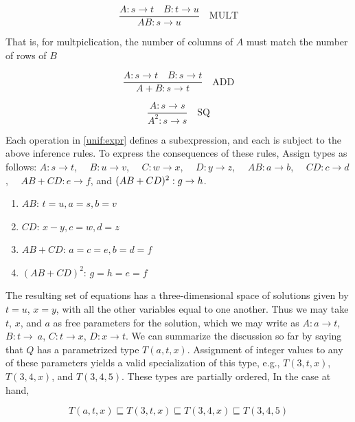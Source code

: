 \begin{equation}
\frac{A : s \to t \quad B : t \to u}{AB : s \to u}\quad \text{MULT}
\end{equation}

That is, for multpiclication, the number of columns of $A$ must match the number of rows of $B$

\begin{equation}
\frac{A : s \to t \quad B : s\to t}{A + B : s \to t}\quad \text{ADD}
\end{equation}


\begin{equation}
\frac{A : s \to s}{A^2 : s \to s}\quad \text{SQ}
\end{equation}

Each operation in \eqref{unif:expr} defines a subexpression, and each is subject to the above inference rules. To express the consequences of these rules,  Assign types as follows: $A : s \to t$, $\quad B : u \to v$, $\quad C : w \to x$, $\quad D : y \to z$, $\quad AB: a \to b$, $\quad CD: c \to d$, $\quad AB + CD : e \to f$, and $\space(AB + CD)^2 : g \to h$.

\begin{enumerate}

\item $AB$: $ t = u, a = s, b = v$

\item $CD$: $x - y, c = w, d = z$

\item $AB + CD$: $a = c = e, b = d = f$

\item $(AB + CD)^2$: $g = h = e = f$

\end{enumerate}

The resulting set of equations has a three-dimensional space of solutions given by $t = u$, $x = y$, with all the other variables equal to one another.  Thus we may take $t$, $x$, and $a$ as free parameters for the solution, which we may write as $A: a \to t$, $B : t \to\
 a$, $C: t \to x$, $D: x \to t$. We can summarize the discussion so far by saying that $Q$ has a parametrized type $T(a,t,x)$.  Assignment of integer values to any of these parameters yields a valid specialization of this type, e.g., $T(3,t,x)$, $T(3,4,x)$, and $T(3,4,5)$. These types are partially ordered,  In the case at hand, 

\begin{equation}
T(a,t,x) \sqsubseteq T(3,t,x)  \sqsubseteq T(3,4,x)  \sqsubseteq T(3,4,5) 
\end{equation}

